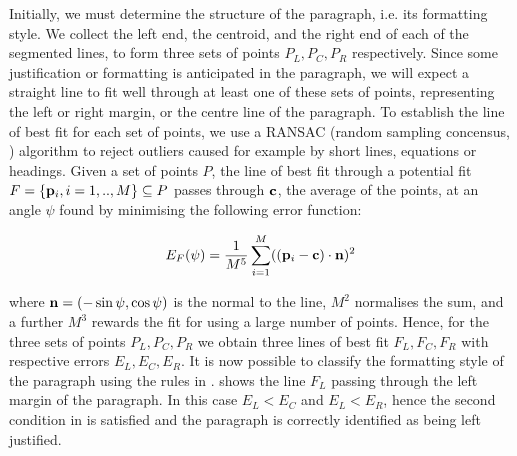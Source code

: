 Initially, we must determine the structure of the paragraph, i.e. its 
formatting style. We collect the left end, the centroid, and the right end of each
of the segmented lines, to form three sets of points $P_L,P_C,P_R$ respectively.
Since some justification or formatting is anticipated in the paragraph, we will
expect a straight line to fit well through at least one of these sets of points,
representing the left or right margin, or the centre line of the paragraph.  To
establish the line of best fit for each set of points, we use a RANSAC (random
sampling concensus, \cite{bolles81ransac-based}) algorithm to reject outliers
caused for example by short lines, equations or headings.  Given a set of points
$P$, the line of best fit through a potential fit 
$F=\{{ \bf p }_i, i=1,..,M\}\subseteq P$ passes through ${ \bf c }$, the average
of the points, at an angle $\psi$ found by minimising the following error function:

\begin{equation}
E_F(\psi) = \frac{1}{M^5} \sum_{i=1}^{M} ( ({ \bf p }_i-{ \bf c }) \cdot { \bf n })^2
\label{ransacerroreqn}
\end{equation}

{\parindent 0mm
where ${ \bf n }=(-\sin \psi,\cos \psi)$ is the normal to the line, $M^{2}$
normalises the sum, and a further $M^{3}$ rewards the fit for using a large
number of points. Hence, for the three sets of points $P_L,P_C,P_R$ we obtain
three lines of best fit $F_L,F_C,F_R$ with respective errors
$E_L,E_C,E_R$.  It is now possible to classify the formatting style of the
paragraph using the rules in .
 shows the line $F_L$ passing through the left margin of
the paragraph.  In this case $E_L<E_C$ and $E_L<E_R$, hence the second
condition in  is satisfied and the paragraph is
correctly identified as being left justified.
}

